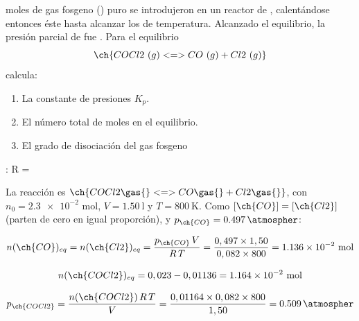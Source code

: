 \begin{exerciseEVAU}
     moles de gas fosgeno () puro se introdujeron en un reactor de , calentándose entonces éste hasta alcanzar los  de temperatura. Alcanzado el equilibrio, la presión parcial de  fue . Para el equilibrio
    \begin{equation*}
        \ch{COCl2\ (g) <=> CO\ (g) + Cl2\ (g)}
    \end{equation*}
    calcula:
    \begin{enumerate}[label=\letraminuscula]
\item La constante de presiones \(K_p\).
\item El número total de moles en el equilibrio.
\item El grado de disociación del gas fosgeno
    \end{enumerate}
    \datos{}: R = \ctegases


    \begin{solu}

        La reacción es \(\ch{COCl2 \gas{} <=> CO \gas{} + Cl2 \gas{}}\), con \(n_0 = \num{2.3e-2}\) mol, \(V = \SI{1.50}{\litre}\) y \(T = \SI{800}{\kelvin}\). Como \([\ch{CO}] = [\ch{Cl2}]\) (parten de cero en igual proporción), y \(p_{\ch{CO}} = \SI{0.497}{\atmospher}\):

        \begin{equation*}
            n(\ch{CO})_{eq} = n(\ch{Cl2})_{eq} = \dfrac{p_{\ch{CO}}\, V}{R\, T} = \dfrac{0,497 \times 1,50}{0,082 \times 800} = \num{1.136e-2} \ \text{mol}
        \end{equation*}

        \begin{equation*}
            n(\ch{COCl2})_{eq} = 0,023 - 0,01136 = \num{1.164e-2} \ \text{mol}
        \end{equation*}

        \begin{equation*}
            p_{\ch{COCl2}} = \dfrac{n(\ch{COCl2})\, R\, T}{V} = \dfrac{0,01164 \times 0,082 \times 800}{1,50} = \SI{0.509}{\atmospher}
        \end{equation*}


\end{solu}
\end{exerciseEVAU}
